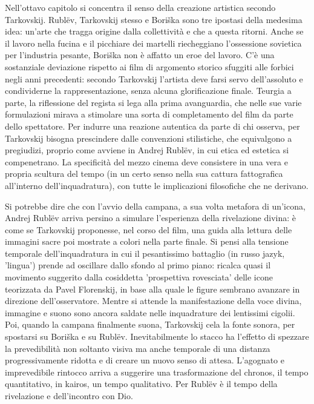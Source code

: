 Nell'ottavo capitolo si concentra il senso della creazione artistica secondo Tarkovskij. Rublëv, Tarkovskij stesso e Boriška sono tre ipostasi della medesima idea: un'arte che tragga origine dalla collettività e che a questa ritorni. Anche se il lavoro nella fucina e il picchiare dei martelli riecheggiano l'ossessione sovietica per l'industria pesante, Boriška non è affatto un eroe del lavoro. C'è una sostanziale deviazione rispetto ai  film di argomento storico sfuggiti alle forbici negli anni precedenti: secondo Tarkovskij l'artista deve farsi servo dell'assoluto e condividerne la rappresentazione, senza alcuna glorificazione finale. Teurgia a parte, la riflessione del regista si lega alla prima avanguardia, che nelle sue varie formulazioni mirava a stimolare una sorta di completamento del film da parte dello spettatore. Per indurre una reazione autentica da parte di chi osserva, per Tarkovskij bisogna prescindere dalle convenzioni stilistiche, che equivalgono a pregiudizi, proprio come avviene in Andrej Rublëv, in cui etica ed estetica si compenetrano. La specificità del mezzo cinema deve consistere in una vera e propria scultura del tempo (in un certo senso nella sua cattura fattografica all'interno dell'inquadratura), con tutte le implicazioni filosofiche che ne derivano.

Si potrebbe dire che con l'avvio della campana, a sua volta metafora di un'icona, Andrej Rublëv arriva persino a simulare l'esperienza della rivelazione divina: è come se Tarkovskij proponesse, nel corso del film, una guida alla lettura delle immagini sacre poi mostrate a colori nella parte finale. Si pensi alla tensione temporale dell'inquadratura in cui il pesantissimo battaglio (in russo jazyk, 'lingua') prende ad oscillare dallo sfondo al primo piano: ricalca quasi il movimento suggerito dalla cosiddetta 'prospettiva rovesciata' delle icone teorizzata da Pavel Florenskij, in base alla quale le figure sembrano avanzare in direzione dell'osservatore. Mentre si attende la manifestazione della voce divina, immagine e suono sono ancora saldate nelle inquadrature dei lentissimi cigolii. Poi, quando la campana finalmente suona, Tarkovskij cela la fonte sonora, per spostarsi su Boriška e su Rublëv. Inevitabilmente lo stacco ha l'effetto di spezzare la prevedibilità non soltanto visiva ma anche temporale di una distanza progressivamente ridotta e di creare un nuovo senso di attesa. L'agognato e imprevedibile rintocco arriva a suggerire una trasformazione del chronos, il tempo quantitativo, in kairos, un tempo qualitativo. Per Rublëv è il tempo della rivelazione e dell'incontro con Dio.

